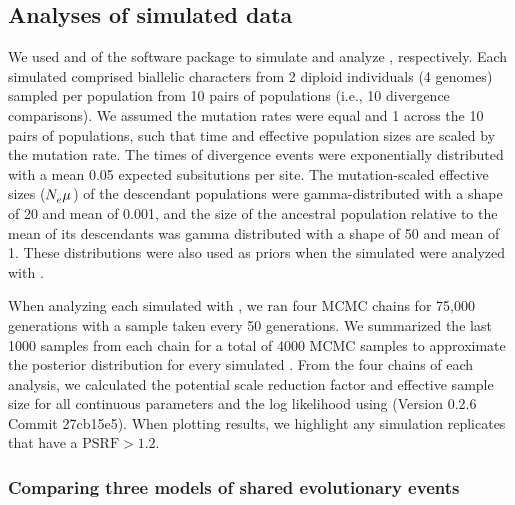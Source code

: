 \subsection{Analyses of simulated data}

We used \simcoevolity and \ecoevolity of the \ecoevolity software
package
\citep[Version 0.3.2 Commit c1685dfa][]{Oaks2018ecoevolity}
to simulate and analyze \datasets, respectively.
Each simulated \dataset comprised biallelic characters from 2 diploid
individuals (4 genomes) sampled per population from 10 pairs of populations
(i.e., 10 divergence comparisons).
We assumed the mutation rates were equal and 1 across the 10 pairs of
populations, such that time and effective population sizes are scaled by the
mutation rate.
The times of divergence events were exponentially distributed with a mean 0.05
expected subsitutions per site.
The mutation-scaled effective sizes ($N_{e}^{}\mu_{}$) of the descendant
populations were gamma-distributed with a shape of 20 and mean of 0.001,
and the size of the ancestral population relative to the mean of its
descendants was gamma distributed with a shape of 50 and mean of 1.
These distributions were also used as priors when the simulated \datasets were
analyzed with \ecoevolity.


When analyzing each simulated \dataset with \ecoevolity,
we ran four MCMC chains for 75,000 generations with a sample taken every 50
generations.
We summarized the last 1000 samples from each chain for a total of 4000 MCMC
samples to approximate the posterior distribution for every simulated \dataset.
From the four chains of each analysis, we calculated the potential
scale reduction factor \citep[PSRF; the square root of Equation 1.1
in][]{Brooks1998} and effective sample size \citep[ESS;][]{Gong2014} for all
continuous parameters and the log likelihood using
\pycoevolity (Version 0.2.6 Commit 27cb15e5).
When plotting results, we highlight any simulation replicates that have a
$\textrm{PSRF} > 1.2$.


\subsubsection{Comparing three models of shared evolutionary events}


